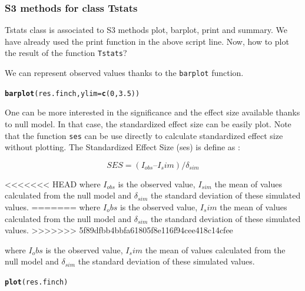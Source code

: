 \documentclass[12pt]{article}\usepackage[]{graphicx}\usepackage[]{color}
\makeatletter
\newcommand{\hlnum}[1]{\textcolor[rgb]{0.686,0.059,0.569}{#1}}%
\newcommand{\hlstd}[1]{\textcolor[rgb]{0.345,0.345,0.345}{#1}}%
\newcommand{\hlkwc}[1]{\textcolor[rgb]{0.333,0.667,0.333}{#1}}%
\newcommand{\hlkwd}[1]{\textcolor[rgb]{0.737,0.353,0.396}{\textbf{#1}}}%
\newenvironment{kframe}{%
 \def\at@end@of@kframe{}%
 \ifinner\ifhmode%
  \def\at@end@of@kframe{\end{minipage}}%
  \begin{minipage}{\columnwidth}%
 \fi\fi%
 \def\FrameCommand##1{\hskip\@totalleftmargin \hskip-\fboxsep
 \colorbox{shadecolor}{##1}\hskip-\fboxsep
     \hskip-\linewidth \hskip-\@totalleftmargin \hskip\columnwidth}%
 \MakeFramed {\advance\hsize-\width
   \@totalleftmargin\z@ \linewidth\hsize
   \@setminipage}}%
 {\par\unskip\endMakeFramed%
 \at@end@of@kframe}
\newenvironment{knitrout}{}{} %
\makeatother
\begin{document}
\subsubsection{S3 methods for class Tstats}
Tstats class is associated to S3 methods plot, barplot, print and summary. We have already used the print function in the above script line. Now, how to plot the result of the function \texttt{Tstats}?

We can represent observed values thanks to the \texttt{barplot} function.
\begin{knitrout}
\color{fgcolor}\begin{kframe}
\begin{alltt}
\hlkwd{barplot}\hlstd{(res.finch,} \hlkwc{ylim} \hlstd{=} \hlkwd{c}\hlstd{(}\hlnum{0}\hlstd{,}\hlnum{3.5}\hlstd{))}
\end{alltt}


{\ttfamily\noindent\bfseries\color{errorcolor}{\#\# Error: objet 'res.finch' introuvable}}\end{kframe}
\end{knitrout}

One can be more interested in the significance  and the effect size available thanks to null model. In that case, the standardized effect size can be easily plot. Note that the function \texttt{ses} can be use directly to calculate standardized effect size without plotting. The Standardized Effect Size (ses) is define as : 

\begin{center}
$$ SES = (I_{obs}  I{_sim}) / \delta_{sim} $$
\end{center}


<<<<<<< HEAD
where $I_{obs}$ is the observed value, $I_{sim}$ the mean of values calculated from the null model and $\delta_{sim}$ the standard deviation of these simulated values.
=======
where $I_obs$ is the observed value, $I_sim$ the mean of values calculated from the null model and $\delta_{sim}$ the standard deviation of these simulated values.
>>>>>>> 5f89dfbb4bbfa61805f8e116f94cee418c14cfee


where $I_obs$ is the observed value, $I_sim$ the mean of values calculated from the null model and $\delta_{sim}$ the standard deviation of these simulated values.


\begin{knitrout}
\color{fgcolor}\begin{kframe}
\begin{alltt}
\hlkwd{plot}\hlstd{(res.finch)}
\end{alltt}


{\ttfamily\noindent\bfseries\color{errorcolor}{\#\# Error: objet 'res.finch' introuvable}}\end{kframe}
\end{knitrout}
\end{document}
